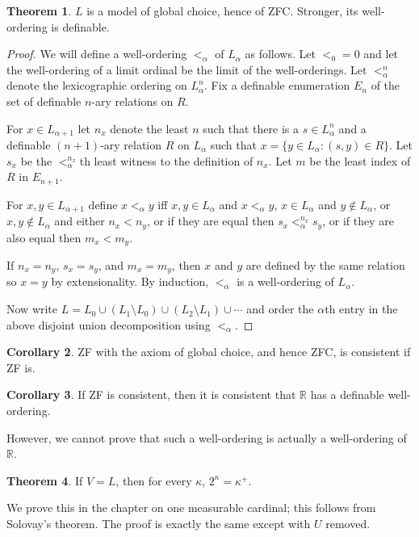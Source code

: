 \documentclass[12pt]{report}
\newcommand{\RR}{\mathbb{R}}
\theoremstyle{definition}
\newtheorem{theorem}{Theorem}[chapter]
\newtheorem{corollary}[theorem]{Corollary}
\begin{document}
\begin{theorem}
$L$ is a model of global choice, hence of ZFC. Stronger, its well-ordering is definable.
\end{theorem}
\begin{proof}
We will define a well-ordering $<_\alpha$ of $L_\alpha$ as follows. Let $<_0 = 0$ and let the well-ordering of a limit ordinal be the limit of the well-orderings. Let $<_\alpha^n$ denote the lexicographic ordering on $L_\alpha^n$. Fix a definable enumeration $E_n$ of the set of definable $n$-ary relations on $R$.

For $x \in L_{\alpha + 1}$ let $n_x$ denote the least $n$ such that there is a $s \in L_\alpha^n$ and a definable $(n+1)$-ary relation $R$ on $L_\alpha$ such that $x = \{y \in L_\alpha: (s, y) \in R\}$. Let $s_x$ be the $<_\alpha^{n_x}$th least witness to the definition of $n_x$. Let $m$ be the least index of $R$ in $E_{n+1}$.

For $x, y \in L_{\alpha + 1}$ define $x <_\alpha y$ iff $x, y \in L_\alpha$ and $x <_\alpha y$, $x \in L_\alpha$ and $y \notin L_\alpha$, or $x, y \notin L_\alpha$ and either $n_x < n_y$, or if they are equal then $s_x <_\alpha^{n_x} s_y$, or if they are also equal then $m_x < m_y$.

If $n_x = n_y$, $s_x = s_y$, and $m_x = m_y$, then $x$ and $y$ are defined by the same relation so $x = y$ by extensionality. By induction, $<_\alpha$ is a well-ordering of $L_\alpha$.

Now write $L = L_0 \cup (L_1 \setminus L_0) \cup (L_2 \setminus L_1) \cup \cdots$ and order the $\alpha$th entry in the above disjoint union decomposition using $<_\alpha$.
\end{proof}

\begin{corollary}
ZF with the axiom of global choice, and hence ZFC, is consistent if ZF is.
\end{corollary}

\begin{corollary}
If ZF is consistent, then it is consistent that $\RR$ has a definable well-ordering.
\end{corollary}
However, we cannot prove that such a well-ordering is actually a well-ordering of $\RR$.

\begin{theorem}
    If $V = L$, then for every $\kappa$, $2^\kappa = \kappa^+$.
\end{theorem}
We prove this in the chapter on one measurable cardinal; this follows from Solovay's theorem. The proof is exactly the same except with $U$ removed.
\end{document}
